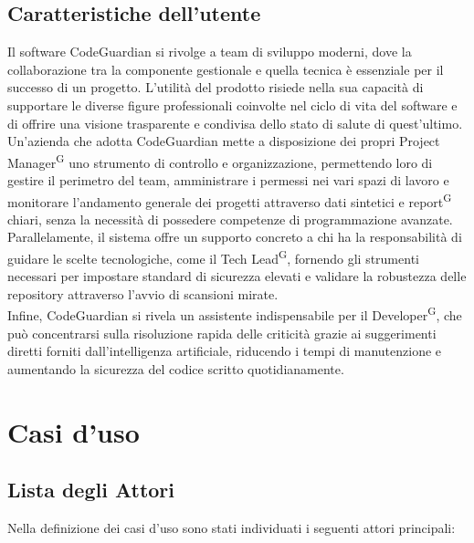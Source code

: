\documentclass[a4paper, 11pt]{article}
\begin{document}
\subsection{Caratteristiche dell'utente}
Il software CodeGuardian si rivolge a team di sviluppo moderni, dove la collaborazione tra la componente gestionale e quella tecnica è essenziale per il successo di un progetto. L'utilità del prodotto risiede nella sua capacità di supportare le diverse figure professionali coinvolte nel ciclo di vita del software e di offrire una visione trasparente e condivisa dello stato di salute di quest'ultimo. 
\\
Un'azienda che adotta CodeGuardian mette a disposizione dei propri Project Manager\textsuperscript{G} uno strumento di controllo e organizzazione, permettendo loro di gestire il perimetro del team, amministrare i permessi nei vari spazi di lavoro e monitorare l'andamento generale dei progetti attraverso dati sintetici e report\textsuperscript{G} chiari, senza la necessità di possedere competenze di programmazione avanzate.
\\
Parallelamente, il sistema offre un supporto concreto a chi ha la responsabilità di guidare le scelte tecnologiche, come il Tech Lead\textsuperscript{G}, fornendo gli strumenti necessari per impostare standard di sicurezza elevati e validare la robustezza delle repository attraverso l'avvio di scansioni mirate. 
\\
Infine, CodeGuardian si rivela un assistente indispensabile per il Developer\textsuperscript{G}, che può concentrarsi sulla risoluzione rapida delle criticità grazie ai suggerimenti diretti forniti dall'intelligenza artificiale, riducendo i tempi di manutenzione e aumentando la sicurezza del codice scritto quotidianamente.

\section{Casi d'uso} \label{sec:casi d'uso}
\subsection{Lista degli Attori}
Nella definizione dei casi d'uso sono stati individuati i seguenti attori principali:
\end{document}
